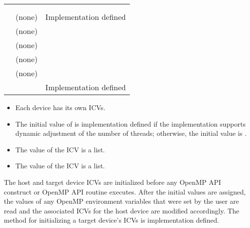 \begin{supertabular}{p{1.4in} p{1.8in} p{1.5in}}
{}    & {}    & {}  \\
{}             & {}             & {}      \\
{}         & (none)                          & Implementation defined \\
{}        & (none)                          & {}          \\
{}        & (none)                          & {}         \\
{}     & (none)                          & {}          \\
{}         & (none)                          & {}           \\
{}     & {}         & Implementation defined \\
\end{supertabular}

\linenumbers

\descr

\begin{itemize}
\item Each device has its own ICVs.
\item The initial value of  is implementation defined if the 
      implementation supports dynamic adjustment of the number of threads; 
      otherwise, the initial value is .
\item The value of the  ICV is a list.
\item The value of the  ICV is a list.
\end{itemize}

The host and target device ICVs are initialized before any OpenMP API construct or
OpenMP API routine executes. After the initial values are assigned, the values of any
OpenMP environment variables that were set by the user are read and the associated
ICVs for the host device are modified accordingly. The method for initializing a target
device's ICVs is implementation defined.

